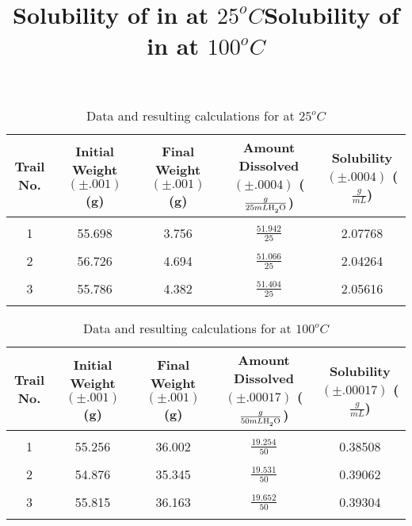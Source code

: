 \documentclass{article}
\begin{document}
\begin{table}[H]
	\centering
	\small
	\title{Solubility of  in  at $25^o C$}
	\tabcolsep=0.11cm 
	\begin{tabular}{ccccc} \\
	Trail No. & Initial Weight $(\pm .001)$ (g) & Final Weight $(\pm .001)$ (g) & Amount Dissolved $(\pm .0004)$ ($\frac{g}{25mL \ce{H_2O}}$) & Solubility $(\pm .0004)$ ($\frac{g}{mL}$) \\ \hline \\
	1 & 55.698 & 3.756 & $\frac{51.942}{25}$ & 2.07768 \\\\
	2 & 56.726 & 4.694 & $\frac{51.066}{25}$ & 2.04264 \\\\
	3 & 55.786 & 4.382 & $\frac{51.404}{25}$ & 2.05616 \\\\
	\end{tabular}
	\caption{Data and resulting calculations for  at $25^o C$} 
	\end{table}


\begin{table}[H]
	\centering
	\small 
	\title{Solubility of  in  at $100^o C$} 
	\tabcolsep=0.11cm 
	\begin{tabular}{ccccc} \\
	Trail No. & Initial Weight $(\pm .001)$ (g) & Final Weight $(\pm .001)$ (g) & Amount Dissolved $(\pm .00017)$  ($\frac{g}{50mL \ce{H_2O}}$) & Solubility $(\pm .00017)$  ($\frac{g}{mL}$) \\ \hline \\
	1 & 55.256 & 36.002 & $\frac{19.254}{50}$ & 0.38508 \\\\
	2 & 54.876 & 35.345 & $\frac{19.531}{50}$ & 0.39062  \\\\
	3 & 55.815 & 36.163 & $\frac{19.652}{50}$ & 0.39304 \\\\
	\end{tabular}
	\caption{Data and resulting calculations for  at $100^o C$} 
	\end{table}
\end{document}
